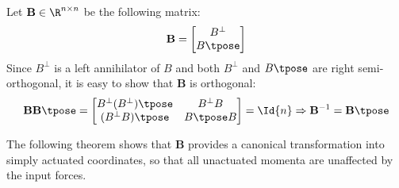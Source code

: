 Let \(\mathbf{B} \in \R^{n\times n}\) be the following matrix:
\[
    \mathbf{B} = 
    \begin{bmatrix}
        B^\perp \\
        B\tpose \\
    \end{bmatrix}
\]
Since \(B^\perp\) is a left annihilator of \(B\) and both \(B^\perp\) and
\(B\tpose\) are right semi-orthogonal, it is easy to show that \(\mathbf{B}\) is
orthogonal:
\[
    \mathbf{B}\mathbf{B}\tpose = 
    \begin{bmatrix}
        B^\perp (B^\perp)\tpose & B^\perp B \\
        (B^\perp B)\tpose & B\tpose B
    \end{bmatrix} = \Id{n}
    \Rightarrow
    \mathbf{B}^{-1} = \mathbf{B}\tpose
\]

The following theorem shows that \(\mathbf{B}\) provides a canonical
transformation into simply actuated coordinates, so that all unactuated momenta
are unaffected by the input forces.

